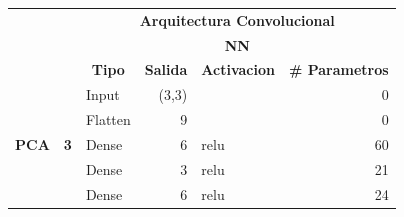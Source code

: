 \begin{table}[]
\centering
\begin{center}
\begin{tabular}{ll|l|r|l|r|}
\cline{3-6}
                                                    &                             & \multicolumn{4}{c|}{\textbf{Arquitectura Convolucional}}                                                                                                           \\ \cline{3-6} 
                                                    &                             & \multicolumn{4}{c|}{\textbf{NN}}                                                                                                                                   \\ \cline{3-6} 
                                                    &                             & \multicolumn{1}{c|}{\textbf{Tipo}} & \multicolumn{1}{c|}{\textbf{Salida}} & \multicolumn{1}{c|}{\textbf{Activacion}} & \multicolumn{1}{l|}{\textbf{\# Parametros}} \\ \hline
\multicolumn{1}{|l|}{\multirow{7}{*}{\textbf{PCA}}} & \multirow{7}{*}{\textbf{3}} & Input                              & (3,3)                                &                                          & 0                                           \\ \cline{3-6} 
\multicolumn{1}{|l|}{}                              &                             & Flatten                            & 9                                    &                                          & 0                                           \\ \cline{3-6} 
\multicolumn{1}{|l|}{}                              &                             & Dense                              & 6                                    & relu                                     & 60                                          \\ \cline{3-6} 
\multicolumn{1}{|l|}{}                              &                             & Dense                              & 3                                    & relu                                     & 21                                          \\ \cline{3-6} 
\multicolumn{1}{|l|}{}                              &                             & Dense                              & 6                                    & relu                                     & 24                                          \\ \cline{3-6} 

\end{tabular}
\end{center}
\end{table}
